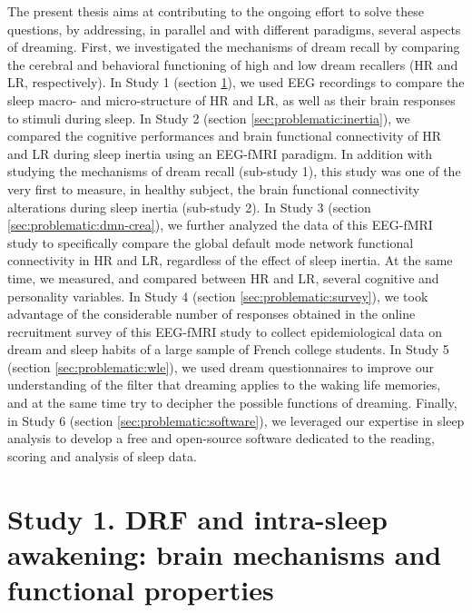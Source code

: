 The present thesis aims at contributing to the ongoing effort to solve these questions, by addressing, in parallel and with different paradigms, several aspects of dreaming. First, we investigated the mechanisms of dream recall by comparing the cerebral and behavioral functioning of high and low dream recallers (HR and LR, respectively). In Study 1 (section \ref{sec:problematic:arousals}), we used EEG recordings to compare the sleep macro- and micro-structure of HR and LR, as well as their brain responses to stimuli during sleep. In Study 2 (section \ref{sec:problematic:inertia}), we compared the cognitive performances and brain functional connectivity of HR and LR during sleep inertia using an EEG-fMRI paradigm. In addition with studying the mechanisms of dream recall (sub-study 1), this study was one of the very first to measure, in healthy subject, the brain functional connectivity alterations during sleep inertia (sub-study 2). In Study 3 (section \ref{sec:problematic:dmn-crea}), we further analyzed the data of this EEG-fMRI study to specifically compare the global default mode network functional connectivity in HR and LR, regardless of the effect of sleep inertia. At the same time, we measured, and compared between HR and LR, several cognitive and personality variables. In Study 4 (section \ref{sec:problematic:survey}), we took advantage of the considerable number of responses obtained in the online recruitment survey of this EEG-fMRI study to collect epidemiological data on dream and sleep habits of a large sample of French college students. In Study 5 (section \ref{sec:problematic:wle}), we used dream questionnaires to improve our understanding of the filter that dreaming applies to the waking life memories, and at the same time try to decipher the possible functions of dreaming. Finally, in Study 6 (section \ref{sec:problematic:software}), we leveraged our expertise in sleep analysis to develop a free and open-source software dedicated to the reading, scoring and analysis of sleep data.

\section{Study 1. DRF and intra-sleep awakening: brain mechanisms and functional properties}
\label{sec:problematic:arousals}

